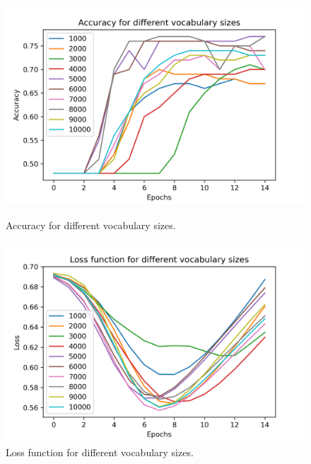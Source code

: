 \documentclass{article}
\begin{document}
\begin{figure}[h!]
  \centering
  \begin{minipage}[b]{0.45\textwidth}
    \includegraphics[width=\textwidth]{images/vocab_size_test_acc.png}
    \caption{Accuracy for different vocabulary sizes.}
  \end{minipage}
  \hfill
  \begin{minipage}[b]{0.45\textwidth}
    \includegraphics[width=\textwidth]{images/vocab_size_test_loss.png}
    \caption{Loss function for different vocabulary sizes.}
  \end{minipage}
  \label{fig:vocab}
\end{figure}
\end{document}
